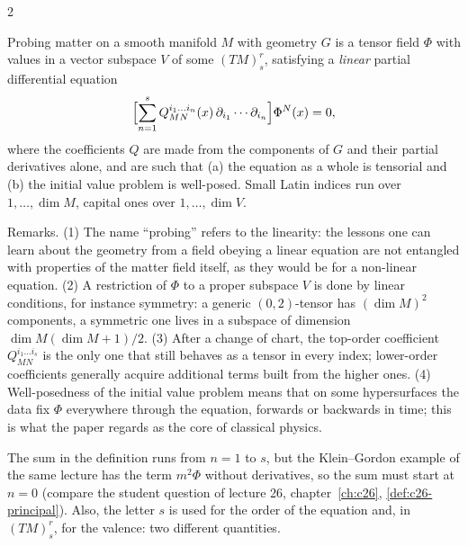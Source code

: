 \begin{paracol}{2}
\begin{definition}\label{def:c29-probing}
Probing matter on a smooth manifold $M$ with geometry $G$ is a tensor field $\Phi$ with values in a vector subspace $V$ of some $(TM)^r_s$, satisfying a \emph{linear} partial differential equation
\[
  \Bigl[\sum_{n=1}^{s}Q_{MN}^{i_1\dots i_n}(x)\,\partial_{i_1}\cdots\partial_{i_n}\Bigr]\Phi^N(x)=0,
\]
where the coefficients $Q$ are made from the components of $G$ and their partial derivatives alone, and are such that (a) the equation as a whole is tensorial and (b) the initial value problem is well-posed. Small Latin indices run over $1,\dots,\dim M$, capital ones over $1,\dots,\dim V$.
\end{definition}

Remarks. (1) The name ``probing'' refers to the linearity: the lessons one can learn about the geometry from a field obeying a linear equation are not entangled with properties of the matter field itself, as they would be for a non-linear equation. (2) A restriction of $\Phi$ to a proper subspace $V$ is done by linear conditions, for instance symmetry: a generic $(0,2)$-tensor has $(\dim M)^2$ components, a symmetric one lives in a subspace of dimension $\dim M(\dim M+1)/2$. (3) After a change of chart, the top-order coefficient $Q^{i_1\dots i_s}_{MN}$ is the only one that still behaves as a tensor in every index; lower-order coefficients generally acquire additional terms built from the higher ones. (4) Well-posedness of the initial value problem means that on some hypersurfaces the data fix $\Phi$ everywhere through the equation, forwards or backwards in time; this is what the paper regards as the core of classical physics.

\begin{coursenote}
The sum in the definition runs from $n=1$ to $s$, but the Klein--Gordon example of the same lecture has the term $m^2\Phi$ without derivatives, so the sum must start at $n=0$ (compare the student question of lecture 26, chapter~\ref{ch:c26}, \cref{def:c26-principal}). Also, the letter $s$ is used for the order of the equation and, in $(TM)^r_s$, for the valence: two different quantities.
\end{coursenote}


\end{paracol}
